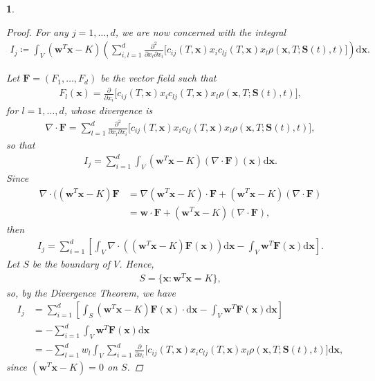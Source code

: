 \documentclass[english]{article}
\numberwithin{equation}{section}
\numberwithin{figure}{section}
\theoremstyle{bolddescit}
\newtheorem{theorem}{\protect\theoremname}[section]
\theoremstyle{definition}
\theoremstyle{definition}
\theoremstyle{plain}
\theoremstyle{plain}
\theoremstyle{bolddesc}
\theoremstyle{plain}
\theoremstyle{remark}
\providecommand{\theoremname}{Theorem}
\begin{document}
\begin{theorem}
\begin{proof}
    For any $j = 1,\ldots,d$, we are now concerned with the integral
    \begin{align*}
      I_j \coloneq \int_V \left(\mathbf{w}^T \mathbf{x} - K\right) \left( \sum_{i,l=1}^{d} \frac{\partial^2}{\partial x_l \partial x_i}\big[c_{ij}(T,\mathbf{x}) x_i c_{lj}(T,\mathbf{x}) x_l \rho(\mathbf{x},T;\mathbf{S}(t),t)\big] \right) \mathrm{d}\mathbf{x}.
    \end{align*}

    Let $\mathbf{F} = (F_1,\ldots,F_d)$ be the vector field such that
    \begin{align*}
      F_l(\mathbf{x}) = \frac{\partial}{\partial x_i} \big[c_{ij}(T,\mathbf{x}) x_i c_{lj}(T,\mathbf{x}) x_l \rho(\mathbf{x},T;\mathbf{S}(t),t)\big],
    \end{align*}
    for $l=1,\ldots,d$, whose divergence is
    \begin{align*}
      \nabla \cdot \mathbf{F} = \sum_{l=1}^{d} \frac{\partial^2}{\partial x_l \partial x_i}\big[c_{ij}(T,\mathbf{x}) x_i c_{lj}(T,\mathbf{x}) x_l \rho(\mathbf{x},T;\mathbf{S}(t),t)\big],
    \end{align*}
    so that
    \begin{align*}
      I_j = \sum_{i=1}^{d} \int_V \left(\mathbf{w}^T \mathbf{x} - K\right) (\nabla \cdot \mathbf{F})(\mathbf{x}) \mathrm{d}\mathbf{x}.
    \end{align*}
    Since
    \begin{align*}
      \nabla \cdot ((\mathbf{w}^T \mathbf{x} - K) \mathbf{F}
      &= \nabla (\mathbf{w}^T \mathbf{x} - K) \cdot \mathbf{F} + (\mathbf{w}^T \mathbf{x} - K) (\nabla \cdot \mathbf{F})\\
      &= \mathbf{w} \cdot \mathbf{F} + (\mathbf{w}^T \mathbf{x} - K) (\nabla \cdot \mathbf{F}),
    \end{align*}
    then
    \begin{align*}
      I_j = \sum_{i=1}^{d} \left[\int_V \nabla \cdot \left(\left(\mathbf{w}^T \mathbf{x} - K\right) \mathbf{F}(\mathbf{x})\right) \mathrm{d}\mathbf{x} - \int_V \mathbf{w}^T \mathbf{F}(\mathbf{x}) \mathrm{d}\mathbf{x} \right].
    \end{align*}
    Let $S$ be the boundary of $V$. Hence,
    \begin{align*}
      S = \{\mathbf{x} : \mathbf{w}^T \mathbf{x} = K\},
    \end{align*}
    so, by the Divergence Theorem, we have
    \begin{align*}
      I_j &= \sum_{i=1}^{d} \left[\int_S \left(\mathbf{w}^T \mathbf{x} - K\right) \mathbf{F}(\mathbf{x}) \cdot \mathrm{d}\mathbf{x} - \int_V \mathbf{w}^T \mathbf{F}(\mathbf{x}) \mathrm{d}\mathbf{x} \right]\\
      &= - \sum_{i=1}^{d} \int_V \mathbf{w}^T \mathbf{F}(\mathbf{x}) \mathrm{d}\mathbf{x}\\
      &= - \sum_{l=1}^{d} w_l \int_V \sum_{i=1}^d \frac{\partial}{\partial x_i} \big[c_{ij}(T,\mathbf{x}) x_i c_{lj}(T,\mathbf{x}) x_l \rho(\mathbf{x},T;\mathbf{S}(t),t)\big] \mathrm{d}\mathbf{x},
    \end{align*}
    since $(\mathbf{w}^T \mathbf{x} - K) = 0$ on $S$.


\end{proof}
\end{theorem}
\end{document}
